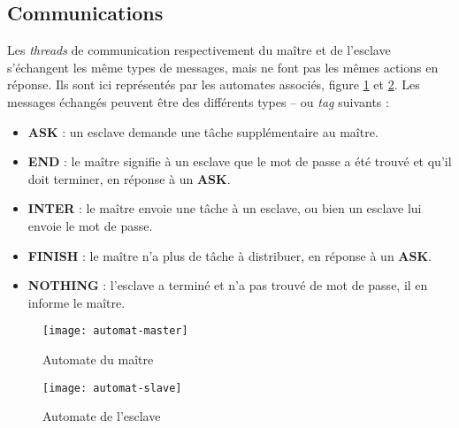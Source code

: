 \subsection{Communications} %
\label{sub:communication}

Les \emph{threads} de communication respectivement du maître et de l'esclave s'échangent les même types de messages, mais ne font pas les mêmes actions en réponse. Ils sont ici représentés par les automates associés, figure \ref{fig:master} et \ref{fig:slave}. Les messages échangés peuvent être des différents types -- ou \emph{tag} suivants :
\begin{itemize}
\item \textbf{ASK} : un esclave demande une tâche supplémentaire au maître.
\item \textbf{END} : le maître signifie à un esclave que le mot de passe a été trouvé et qu'il doit terminer, en réponse à un \textbf{ASK}.
\item \textbf{INTER} : le maître envoie une tâche à un esclave, ou bien un esclave lui envoie le mot de passe. 
\item \textbf{FINISH} : le maître n'a plus de tâche à distribuer, en réponse à un \textbf{ASK}.
\item \textbf{NOTHING} : l'esclave a terminé et n'a pas trouvé de mot de passe, il en informe le maître.
\end{itemize}

\begin{figure}[h!]
\centering
\texttt{[image: automat-master]}
\caption{Automate du maître}
\label{fig:master}
\end{figure}


\begin{figure}[h!]
\centering
\texttt{[image: automat-slave]}
\caption{Automate de l'esclave}
\label{fig:slave}
\end{figure}
